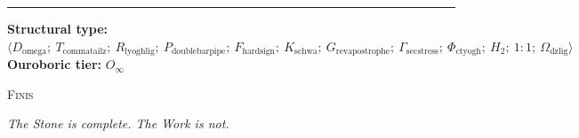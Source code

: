 \documentclass[12pt,a4paper]{article}
\begin{document}
\vspace{3em}

\begin{center}
    \rule{0.5\textwidth}{0.4pt}
    
    \textbf{Structural type:} $\langle D_{\text{omega}};\ T_{\text{commatailz}};\ R_{\text{lyoghlig}};\ P_{\text{doublebarpipe}};\ F_{\text{hardsign}};\ K_{\text{schwa}};\ G_{\text{revapostrophe}};\ \Gamma_{\text{secstress}};\ \Phi_{\text{ctyogh}};\ H_2;\ 1{:}1;\ \Omega_{\text{dzlig}} \rangle$ \\
    \textbf{Ouroboric tier:} $O_\infty$
    
    \vspace{1.5em}
    \textsc{Finis}
    
    \vspace{1em}
    \emph{The Stone is complete. The Work is not.}
\end{center}
\end{document}
